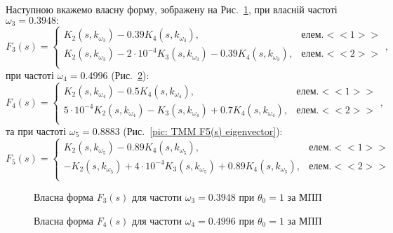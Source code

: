 \documentclass{mathreport}
\begin{document}
Наступною вкажемо власну форму, зображену на Рис.~\ref{pic: TMM F3(s) eigenvector}, при власній частоті $\omega_3 = 0.3948:$
\begin{equation}\label{eq: TMM F3(s) eigenvector}
    F_3(s) = 
    \begin{cases*}
        K_2(s,k_{\omega_3}) - 0.39 K_4(s,k_{\omega_3}), & елем. <<1>> \\
        K_2(s,k_{\omega_3}) - 2\cdot 10^{-4} K_3(s,k_{\omega_3}) - 0.39 K_4(s,k_{\omega_3}), & елем. <<2>> \\
    \end{cases*},
\end{equation}
при частоті $\omega_4 = 0.4996$ (Рис.~\ref{pic: TMM F4(s) eigenvector}):
\begin{equation}\label{eq: TMM F4(s) eigenvector}
    F_4(s) = 
    \begin{cases*}
        K_2(s,k_{\omega_4}) - 0.5 K_4(s,k_{\omega_4}), & елем. <<1>> \\
        5\cdot 10^{-4} K_2(s,k_{\omega_4}) - K_3(s,k_{\omega_4}) + 0.7 K_4(s,k_{\omega_4}), & елем. <<2>> \\
    \end{cases*},
\end{equation}
та при частоті $\omega_5 = 0.8883$ (Рис.~\ref{pic: TMM F5(s) eigenvector}):
\begin{equation}\label{eq: TMM F5(s) eigenvector}
    F_5(s) = 
    \begin{cases*}
        K_2(s,k_{\omega_5}) - 0.89 K_4(s,k_{\omega_5}), & елем. <<1>> \\
        -K_2(s,k_{\omega_5}) + 4\cdot 10^{-4} K_3(s,k_{\omega_5}) + 0.89 K_4(s,k_{\omega_5}), & елем. <<2>> \\
    \end{cases*}
\end{equation}

\begin{figure}[H]\centering
    \resizebox{\linewidth}{!}{}
    \caption{Власна форма $F_3(s)$ для частоти $\omega_3 = 0.3948$ при $\theta_0=1$ за МПП}
    \label{pic: TMM F3(s) eigenvector}
\end{figure}

\begin{figure}[H]\centering
    \resizebox{\linewidth}{!}{}
    \caption{Власна форма $F_4(s)$ для частоти $\omega_4 = 0.4996$ при $\theta_0=1$ за МПП}
    \label{pic: TMM F4(s) eigenvector}
\end{figure}
\end{document}
